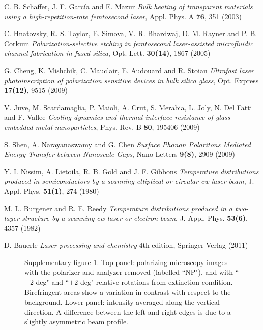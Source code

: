 \documentclass[5p]{elsarticle}
\begin{document}
\begin{thebibliography}{}
C. B. Schaffer, J. F. García and E. Mazur \emph{Bulk heating of transparent materials using a high-repetition-rate femtosecond laser}, Appl. Phys. A \textbf{76}, 351 (2003)

C. Hnatovsky, R. S. Taylor, E. Simova, V. R. Bhardwaj, D. M. Rayner and P. B. Corkum \emph{Polarization-selective etching in femtosecond laser-assisted microfluidic channel fabrication in fused silica}, Opt. Lett. \textbf{30(14)}, 1867 (2005)

G. Cheng, K. Mishchik, C. Mauclair, E. Audouard and R. Stoian \emph{Ultrafast laser photoinscription of polarization sensitive devices in bulk silica glass}, Opt. Express \textbf{17(12)}, 9515 (2009)

V. Juve, M. Scardamaglia, P. Maioli, A. Crut, S. Merabia, L. Joly, N. Del Fatti and F. Vallee \emph{Cooling dynamics and thermal interface resistance of glass-embedded metal nanoparticles}, Phys. Rev. B \textbf{80}, 195406 (2009)

S. Shen, A. Narayanaswamy and G. Chen \emph{Surface Phonon Polaritons Mediated Energy Transfer between Nanoscale Gaps}, Nano Letters \textbf{9(8)}, 2909 (2009)

Y. I. Nissim, A. Lietoila, R. B. Gold and J. F. Gibbons \emph{Temperature distributions produced in semiconductors by a scanning elliptical or circular cw laser beam}, J. Appl. Phys. \textbf{51(1)}, 274 (1980)

M. L. Burgener and R. E. Reedy \emph{Temperature distributions produced in a two-layer structure by a scanning cw laser or electron beam}, J. Appl. Phys. \textbf{53(6)}, 4357 (1982)

D. Bauerle \emph{Laser processing and chemistry} 4th edition, Springer Verlag (2011)

\end{thebibliography}

\begin{figure}
\centering{}
\caption{\label{fig:Figure1} Supplementary figure 1. Top panel: polarizing microscopy images with the polarizer and analyzer removed (labelled ``NP"), and with ``$-2$ deg" and ``$+2$ deg" relative rotations from extinction condition. Birefringent areas show a variation in contrast with respect to the background. Lower panel: intensity averaged along the vertical direction. A difference between the left and right edges is due to a slightly asymmetric beam profile.}
\end{figure}
\end{document}
